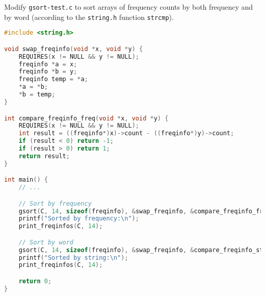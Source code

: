 \begin{part}
  Modify \lstinline'gsort-test.c' to sort arrays of frequency counts
  by both frequency and by word (according to the \lstinline'string.h'
  function \lstinline'strcmp').

\threePT

\begin{solution}
\begin{lstlisting}[language=C]
#include <string.h>

void swap_freqinfo(void *x, void *y) {
    REQUIRES(x != NULL && y != NULL);
    freqinfo *a = x;
    freqinfo *b = y;
    freqinfo temp = *a;
    *a = *b;
    *b = temp;
}

int compare_freqinfo_freq(void *x, void *y) {
    REQUIRES(x != NULL && y != NULL);
    int result = ((freqinfo*)x)->count - ((freqinfo*)y)->count;
    if (result < 0) return -1;
    if (result > 0) return 1;
    return result;
}

int main() {
    // ...

    // Sort by frequency
    gsort(C, 14, sizeof(freqinfo), &swap_freqinfo, &compare_freqinfo_freq);
    printf("Sorted by frequency:\n");
    print_freqinfos(C, 14);

    // Sort by word
    gsort(C, 14, sizeof(freqinfo), &swap_freqinfo, &compare_freqinfo_str);
    printf("Sorted by string:\n");
    print_freqinfos(C, 14);

    return 0;
}
\end{lstlisting}
\end{solution}
\end{part}
